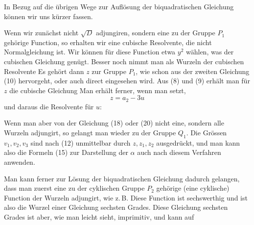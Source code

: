 

In Bezug auf die übrigen Wege zur Auflösung der biquadratischen Gleichung können wir uns kürzer fassen.

Wenn wir zunächst nicht $\sqrt{D}$ adjungiren, sondern eine zu der Gruppe $P_1$ gehörige Function, so erhalten wir eine cubische Resolvente, die nicht Normalgleichung ist. Wir können für diese Function etwa $y^2$ wählen, was der cubischen Gleichung
genügt. Besser noch nimmt man als Wurzeln der cubischen Resolvente
Es gehört dann $z$ zur Gruppe $P_1$, wie schon aus der zweiten Gleichung (10) hervorgeht, oder auch direct eingesehen wird. Aus (8) und (9) erhält man für $z$ die cubische Gleichung
Man erhält ferner, wenn man
setzt,
\[
z = a_2 - 3u
\]
und daraus die Resolvente für $u$:

Wenn man aber von der Gleichung (18) oder (20) nicht eine, sondern alle Wurzeln adjungirt, so gelangt man wieder zu der Gruppe $Q_1$. Die Grössen $v_1, v_2, v_3$ sind nach (12) unmittelbar durch $z, z_1, z_2$ ausgedrückt, und man kann also die Formeln (15) zur Darstellung der $\alpha$ auch nach diesem Verfahren anwenden.

Man kann ferner zur Lösung der biquadratischen Gleichung dadurch gelangen, dass man zuerst eine zu der cyklischen Gruppe $P_2$ gehörige (eine cyklische) Function der Wurzeln adjungirt, wie z.\,B.
Diese Function ist sechswerthig und ist also die Wurzel einer Gleichung sechsten Grades. Diese Gleichung sechsten Grades ist aber, wie man leicht sieht, imprimitiv, und kann auf
